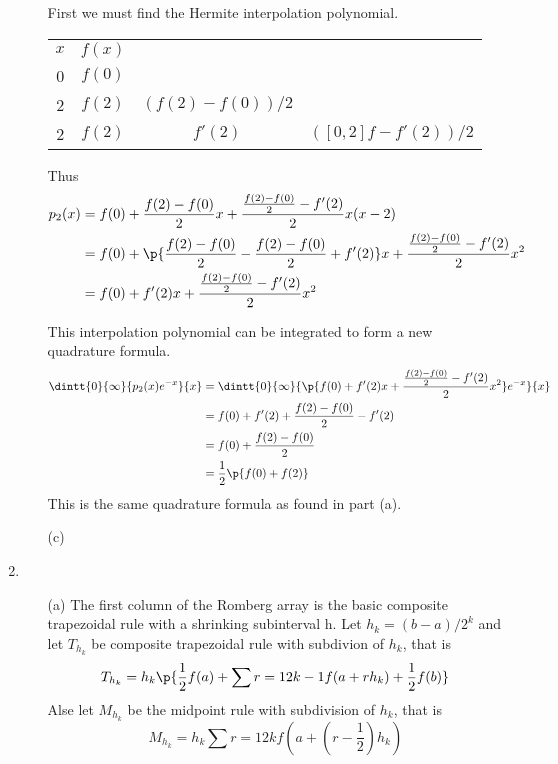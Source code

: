 \documentclass[11pt]{article}
\begin{document}
\begin{enumerate}
\begin{enumerate}
                First we must find the Hermite interpolation polynomial.
                \begin{center}
                \begin{tabular}{cccc}
                    $x$ & $f(x)$ & & \\
                    0   & $f(0)$ & & \\
                    2   & $f(2)$ & $(f(2) - f(0))/2$ & \\
                    2   & $f(2)$ & $f'(2)$ & $([0,2]f - f'(2))/2$
                \end{tabular}
                \end{center}
                Thus
                \begin{align*}
                    p_2(x) &= f(0) + \frac{f(2) - f(0)}{2} x +
                    \frac{\frac{f(2) - f(0)}{2} - f'(2)}{2} x(x - 2) \\
                    &=  f(0) + \p{\frac{f(2) - f(0)}{2} - \frac{f(2) - f(0)}{2} + f'(2)} x +
                    \frac{\frac{f(2) - f(0)}{2} - f'(2)}{2} x^2 \\
                    &= f(0) + f'(2) x + \frac{\frac{f(2) - f(0)}{2} - f'(2)}{2} x^2 \\
                \end{align*}

                This interpolation polynomial can be integrated to form a new
                quadrature formula.
                \begin{align*}
                    \dintt{0}{\infty}{p_2(x) e^{-x}}{x} &= 
                        \dintt{0}{\infty}{\p{f(0) + f'(2) x + \frac{\frac{f(2) - f(0)}{2} - f'(2)}{2} x^2}e^{-x}}{x} \\
                    &=  f(0) + f'(2) + \frac{f(2) - f(0)}{2} - f'(2) \\
                    &= f(0) + \frac{f(2) - f(0)}{2} \\
                    &= \frac{1}{2} \p{f(0) + f(2)}
                \end{align*}
                This is the same quadrature formula as found in part (a).

            \item[(c)] %
        \end{enumerate}

    \item %
        \begin{enumerate}
            \item[(a)]
                The first column of the Romberg array is the basic composite
                trapezoidal rule with a shrinking subinterval h.
                Let $h_k = (b-a)/2^k$ and let $T_{h_k}$ be composite trapezoidal
                rule with subdivion of $h_k$, that is
                \[
                    T_{h_k} = h_k \p{\frac{1}{2} f(a) + \sum{r=1}{2k-1}{f(a + r h_k)}
                        + \frac{1}{2} f(b)}
                \]
                Alse let $M_{h_k}$ be the midpoint rule with subdivision of
                $h_k$, that is
                \[
                    M_{h_k} = h_k \sum{r=1}{2k}{f(a + (r - \frac{1}{2})h_k)}
                \]


\end{enumerate}
\end{enumerate}
\end{document}

